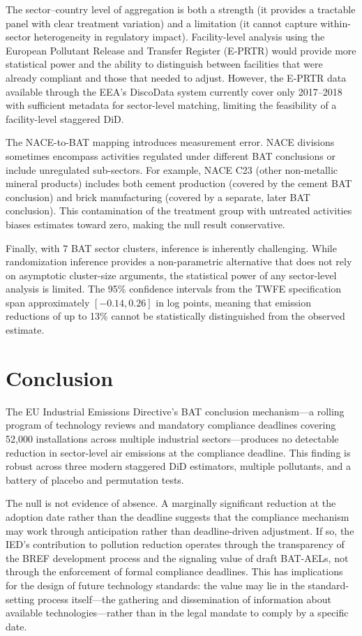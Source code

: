 \documentclass[12pt]{article}
\begin{document}
The sector--country level of aggregation is both a strength (it provides a tractable panel with clear treatment variation) and a limitation (it cannot capture within-sector heterogeneity in regulatory impact). Facility-level analysis using the European Pollutant Release and Transfer Register (E-PRTR) would provide more statistical power and the ability to distinguish between facilities that were already compliant and those that needed to adjust. However, the E-PRTR data available through the EEA's DiscoData system currently cover only 2017--2018 with sufficient metadata for sector-level matching, limiting the feasibility of a facility-level staggered DiD.

The NACE-to-BAT mapping introduces measurement error. NACE divisions sometimes encompass activities regulated under different BAT conclusions or include unregulated sub-sectors. For example, NACE C23 (other non-metallic mineral products) includes both cement production (covered by the cement BAT conclusion) and brick manufacturing (covered by a separate, later BAT conclusion). This contamination of the treatment group with untreated activities biases estimates toward zero, making the null result conservative.

Finally, with 7 BAT sector clusters, inference is inherently challenging. While randomization inference provides a non-parametric alternative that does not rely on asymptotic cluster-size arguments, the statistical power of any sector-level analysis is limited. The 95\% confidence intervals from the TWFE specification span approximately $[-0.14, 0.26]$ in log points, meaning that emission reductions of up to 13\% cannot be statistically distinguished from the observed estimate.


\section{Conclusion}

The EU Industrial Emissions Directive's BAT conclusion mechanism---a rolling program of technology reviews and mandatory compliance deadlines covering 52,000 installations across multiple industrial sectors---produces no detectable reduction in sector-level air emissions at the compliance deadline. This finding is robust across three modern staggered DiD estimators, multiple pollutants, and a battery of placebo and permutation tests.

The null is not evidence of absence. A marginally significant reduction at the adoption date rather than the deadline suggests that the compliance mechanism may work through anticipation rather than deadline-driven adjustment. If so, the IED's contribution to pollution reduction operates through the transparency of the BREF development process and the signaling value of draft BAT-AELs, not through the enforcement of formal compliance deadlines. This has implications for the design of future technology standards: the value may lie in the standard-setting process itself---the gathering and dissemination of information about available technologies---rather than in the legal mandate to comply by a specific date.
\end{document}
